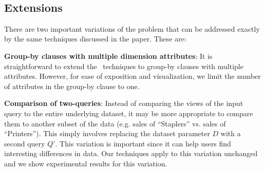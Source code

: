  \\

\subsection{Extensions}
There are two important variations of the problem that can be addressed exactly
by the same techniques discussed in the paper. These are:
\begin{denselist}
\item {\bf Group-by clauses with multiple dimension attributes}: It is
straightforward to extend the \SeeDB\ techniques  to group-by clauses with multiple attributes.
However, for ease of exposition and visualization, we limit the number of
attributes in the group-by clause to one.
\item {\bf Comparison of two-queries}: Instead of comparing the views of
the input query to the entire underlying dataset, it may be more appropriate to
compare them to another subset of the data (e.g. sales of ``Staplers'' vs.
sales of ``Printers''). This simply involves replacing the dataset parameter $D$
with a second query $Q'$. This variation is important since it can help users
find interesting differences in data. Our techniques apply to this variation
unchanged and we show experimental results for this variation.
\end{denselist} 


